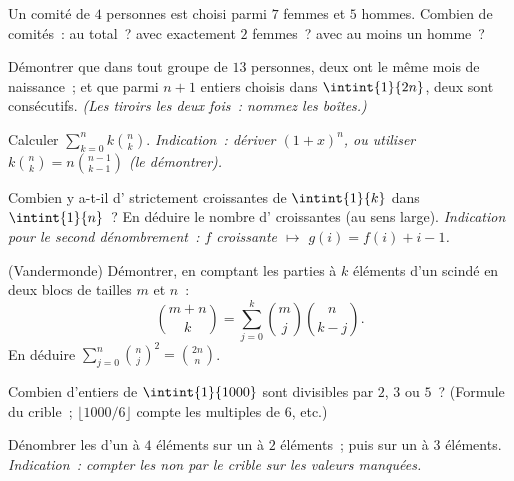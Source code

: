 \begin{exercise}[$\star$]\label{exo:b1:counting:3}
Un comité de $4$ personnes est choisi parmi $7$ femmes et $5$ hommes.
Combien de comités~: au total~? avec exactement $2$ femmes~? avec au
moins un homme~?
\end{exercise}

\begin{exercise}[$\star$]\label{exo:b1:counting:4}
Démontrer que dans tout groupe de $13$ personnes, deux ont le même mois
de naissance~; et que parmi $n + 1$ entiers choisis dans $\intint{1}{2n}$, deux sont consécutifs. \emph{(Les tiroirs les deux fois~:
nommez les boîtes.)}
\end{exercise}

\begin{exercise}[$\star$]\label{exo:b1:counting:5}
Calculer $\sum_{k=0}^{n} k \binom{n}{k}$. \emph{Indication~: dériver
$(1 + x)^n$, ou utiliser $k \binom nk = n \binom{n-1}{k-1}$ (le démontrer).}
\end{exercise}

\begin{exercise}[$\star\star$]\label{exo:b1:counting:6}
Combien y a-t-il d' strictement croissantes de $\intint{1}{k}$ dans $\intint{1}{n}$~? En déduire le nombre
d' croissantes (au sens large). \emph{Indication pour le second
dénombrement~: $f$ croissante $\mapsto$ $g(i) = f(i) + i - 1$.}
\end{exercise}

\begin{exercise}[$\star\star$]\label{exo:b1:counting:7}
(Vandermonde) Démontrer, en comptant les parties à $k$ éléments d'un
 scindé en deux blocs de tailles $m$ et $n$~:
\[
\binom{m+n}{k} = \sum_{j=0}^{k} \binom{m}{j} \binom{n}{k-j} .
\]
En déduire $\sum_{j=0}^{n} \binom nj^2 = \binom{2n}{n}$.
\end{exercise}

\begin{exercise}[$\star\star$]\label{exo:b1:counting:8}
Combien d'entiers de $\intint{1}{1000}$ sont divisibles par
$2$, $3$ ou $5$~? (Formule du crible~; $\lfloor 1000/6 \rfloor$
compte les multiples de $6$, etc.)
\end{exercise}

\begin{exercise}[$\star\star$]\label{exo:b1:counting:9}
Dénombrer les  d'un  à $4$ éléments sur un  à
$2$ éléments~; puis sur un  à $3$ éléments. \emph{Indication~:
compter les  non  par le crible sur les valeurs
manquées.}
\end{exercise}

